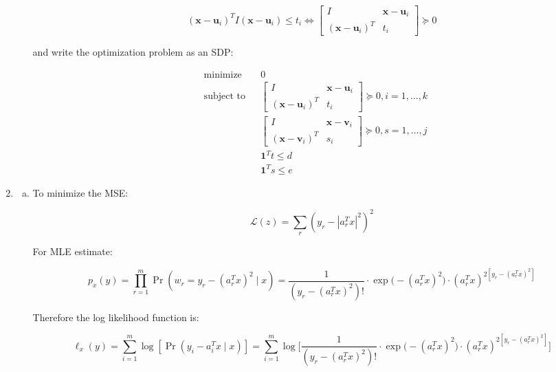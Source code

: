 \begin{enumerate}[(1)]
\begin{enumerate}[(a)]
\[
(\boldsymbol{x} - \boldsymbol{u}_i )^T I (\boldsymbol{x} - \boldsymbol{u}_i )  \leq t_i \iff  \begin{bmatrix}
    I      & \boldsymbol{x} - \boldsymbol{u}_i\\
    (\boldsymbol{x} - \boldsymbol{u}_i)^T & t_i
\end{bmatrix} \succeq 0 
\]

and write the optimization problem as an SDP:

\[
\boxed{
\begin{aligned}
& {\text{minimize}}
& & 0 \\
& \text{subject to}
& & \begin{bmatrix}
    I      & \boldsymbol{x} - \boldsymbol{u}_i\\
    (\boldsymbol{x} - \boldsymbol{u}_i)^T & t_i
\end{bmatrix} \succeq 0  , i = 1, \ldots, k \\
& & & \begin{bmatrix}
    I      & \boldsymbol{x} - \boldsymbol{v}_i\\
    (\boldsymbol{x} - \boldsymbol{v}_i)^T & s_i
\end{bmatrix} \succeq 0 , s = 1, \ldots, j \\
& & & \boldsymbol{1}^T t \leq d \\
& & & \boldsymbol{1}^T s \leq e
\end{aligned}}
\]

\end{enumerate}


\item

\begin{enumerate}[(a)]

\item To minimize the MSE:

\[
\mathcal{L}(z) = \sum_{r} (y_r - | a_r^T x|^2)^2 
\]

For MLE estimate:

\[
p_x(y) = \prod_{r=1}^m \Pr(w_r = y_r - (a_r^Tx)^2 \mid x) = \frac{1}{(y_r - (a_r^Tx)^2)!} \cdot \exp\big(-(a_r^Tx)^2 \big) \cdot (a_r^Tx)^{2 [y_r - (a_r^Tx)^2]}
\]

Therefore the log likelihood function is:

\[
\ell_x (y) = \sum_{i=1}^m \log [ \Pr(y_i - a_i^Tx \mid x)] = \sum_{i=1}^m \log \bigg[ \frac{1}{(y_r - (a_r^Tx)^2)!} \cdot \exp\big(-(a_r^Tx)^2 \big) \cdot (a_r^Tx)^{2[y_r - (a_r^Tx)^2]} \bigg]
\]


\end{enumerate}
\end{enumerate}
